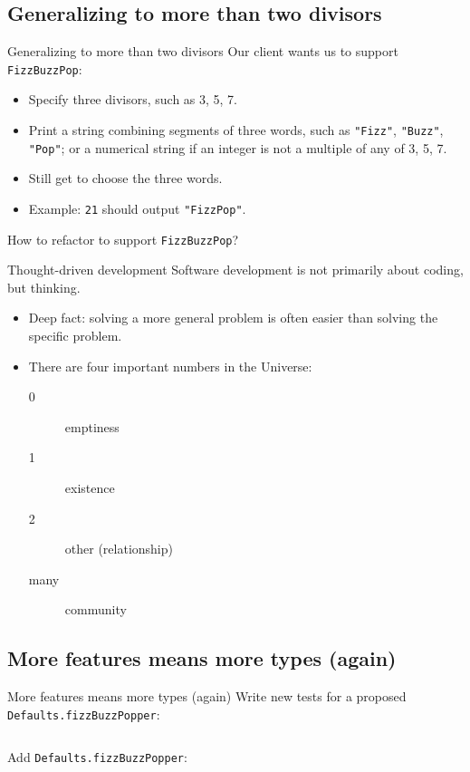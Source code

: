 \subsection{Generalizing to more than two divisors}

\begin{frame}[fragile]{Generalizing to more than two divisors}
  Our client wants us to support \texttt{FizzBuzzPop}:
  \begin{itemize}
  \item Specify three divisors, such as 3, 5, 7.
  \item Print a string combining segments of three words, such as \texttt{"Fizz"}, \texttt{"Buzz"}, \texttt{"Pop"}; or a numerical string if an integer is not a multiple of any of 3, 5, 7.
  \item Still get to choose the three words.
  \item Example: \texttt{21} should output \texttt{"FizzPop"}.
  \end{itemize}

  How to refactor to support \texttt{FizzBuzzPop}?
\end{frame}

\begin{frame}{Thought-driven development}
    Software development is not primarily about \alert{coding}, but \alert{thinking}.

  \begin{itemize}
  \item Deep fact: solving a more general problem is often easier than solving the specific problem.
  \item There are four important numbers in the Universe:
    \begin{description}
    \item[0] emptiness
    \item[1] existence
    \item[2] other (relationship)
    \item[many] community
    \end{description}
  \end{itemize}
\end{frame}

\subsection{More features means more types (again)}

\begin{frame}[fragile]{More features means more types (again)}
  Write new tests for a proposed \texttt{Defaults.fizzBuzzPopper}:

  \inputminted[gobble=2]{scala}{FizzBuzzSpec5.scala}

  Add \texttt{Defaults.fizzBuzzPopper}:
  \inputminted[gobble=2]{scala}{Defaults2.scala}
\end{frame}

